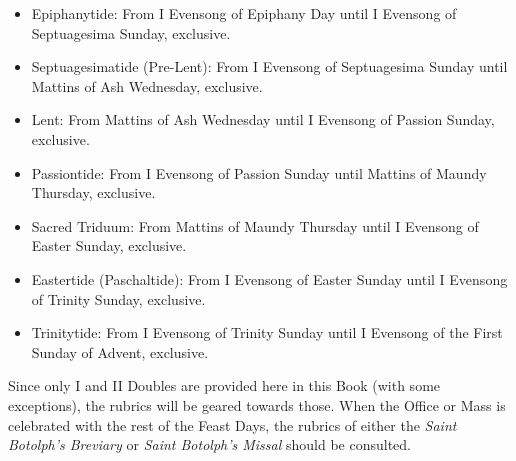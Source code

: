 \begin{description}
\begin{itemize}
        \item Epiphanytide: From I Evensong of Epiphany Day until I Evensong of Septuagesima Sunday, exclusive.
        \item Septuagesimatide (Pre-Lent): From I Evensong of Septuagesima Sunday until Mattins of Ash Wednesday, exclusive.
        \item Lent: From Mattins of Ash Wednesday until I Evensong of Passion Sunday, exclusive.
        \item Passiontide: From I Evensong of Passion Sunday until Mattins of Maundy Thursday, exclusive.
        \item Sacred Triduum: From Mattins of Maundy Thursday until I Evensong of Easter Sunday, exclusive.
        \item Eastertide (Paschaltide): From I Evensong of Easter Sunday until I Evensong of Trinity Sunday, exclusive.
        \item Trinitytide: From I Evensong of Trinity Sunday until I Evensong of the First Sunday of Advent, exclusive.
    \end{itemize}
\item[Minor Feast Days] Since only I and II Doubles are provided here in this Book (with some exceptions), the rubrics will be geared towards those. When the Office or Mass is celebrated with the rest of the Feast Days, the rubrics of either the \emph{Saint Botolph's Breviary} or \textit{Saint Botolph's Missal} should be consulted.%


\end{description}
